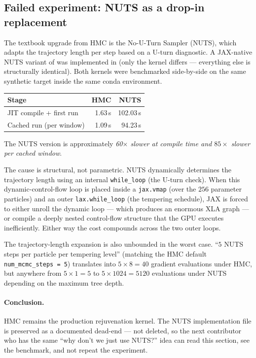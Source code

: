 \subsection{Failed experiment: NUTS as a drop-in replacement} \label{sec:nuts-failed}

The textbook upgrade from HMC is the No-U-Turn Sampler (NUTS), which
adapts the trajectory length per step based on a U-turn diagnostic. A
JAX-native NUTS variant of  was implemented
in  (only the kernel
differs --- everything else is structurally identical). Both kernels
were benchmarked side-by-side on the same synthetic target inside the
same conda environment.

\begin{center}
\begin{tabular}{lrr}
\toprule
Stage & HMC & NUTS \\
\midrule
JIT compile + first run        & 1.63\,s & 102.03\,s \\
Cached run (per window)         & 1.09\,s & 94.23\,s \\
\bottomrule
\end{tabular}
\end{center}

The NUTS version is approximately \emph{60$\times$ slower at compile
time and $85\times$ slower per cached window}.

The cause is structural, not parametric. NUTS dynamically determines
the trajectory length using an internal \texttt{while\_loop} (the
U-turn check). When this dynamic-control-flow loop is placed inside
a \texttt{jax.vmap} (over the $256$ parameter particles) and an outer
\texttt{lax.while\_loop} (the tempering schedule), JAX is forced to
either unroll the dynamic loop --- which produces an enormous XLA
graph --- or compile a deeply nested control-flow structure that the
GPU executes inefficiently. Either way the cost compounds across the
two outer loops.

The trajectory-length expansion is also unbounded in the worst case.
``$5$ NUTS steps per particle per tempering level'' (matching the HMC
default \texttt{num\_mcmc\_steps = 5}) translates into $5 \times 8 =
40$ gradient evaluations under HMC, but anywhere from $5 \times 1 =
5$ to $5 \times 1024 = 5120$ evaluations under NUTS depending on the
maximum tree depth.

\paragraph{Conclusion.} HMC remains the production rejuvenation
kernel. The NUTS implementation file
 is preserved as a documented
dead-end --- not deleted, so the next contributor who has the same
``why don't we just use NUTS?'' idea can read this section, see the
benchmark, and not repeat the experiment.

